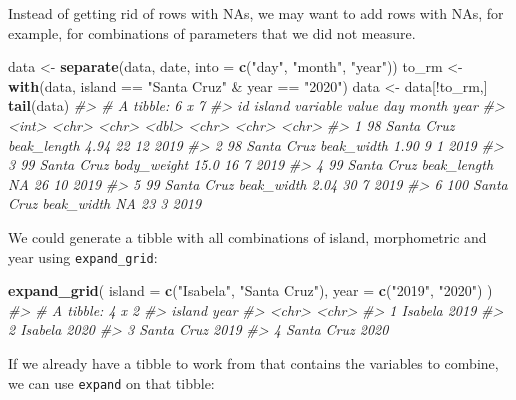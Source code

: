 \documentclass[]{book}
\newenvironment{Shaded}{}{}
\newcommand{\CommentTok}[1]{\textcolor[rgb]{0.38,0.63,0.69}{\textit{#1}}}
\newcommand{\DataTypeTok}[1]{\textcolor[rgb]{0.56,0.13,0.00}{#1}}
\newcommand{\KeywordTok}[1]{\textcolor[rgb]{0.00,0.44,0.13}{\textbf{#1}}}
\newcommand{\NormalTok}[1]{#1}
\newcommand{\OperatorTok}[1]{\textcolor[rgb]{0.40,0.40,0.40}{#1}}
\newcommand{\StringTok}[1]{\textcolor[rgb]{0.25,0.44,0.63}{#1}}
\begin{document}
Instead of getting rid of rows with NAs, we may want to add rows with NAs, for example, for combinations of parameters that we did not measure.

\begin{Shaded}
\begin{Highlighting}[]
\NormalTok{data <-}\StringTok{ }\KeywordTok{separate}\NormalTok{(data, date, }\DataTypeTok{into =} \KeywordTok{c}\NormalTok{(}\StringTok{"day"}\NormalTok{, }\StringTok{"month"}\NormalTok{, }\StringTok{"year"}\NormalTok{))}
\NormalTok{to_rm <-}\StringTok{ }\KeywordTok{with}\NormalTok{(data, island }\OperatorTok{==}\StringTok{ "Santa Cruz"} \OperatorTok{&}\StringTok{ }\NormalTok{year }\OperatorTok{==}\StringTok{ "2020"}\NormalTok{)}
\NormalTok{data <-}\StringTok{ }\NormalTok{data[}\OperatorTok{!}\NormalTok{to_rm,]}
\KeywordTok{tail}\NormalTok{(data)}
\CommentTok{#> # A tibble: 6 x 7}
\CommentTok{#>      id island     variable    value day   month year }
\CommentTok{#>   <int> <chr>      <chr>       <dbl> <chr> <chr> <chr>}
\CommentTok{#> 1    98 Santa Cruz beak_length  4.94 22    12    2019 }
\CommentTok{#> 2    98 Santa Cruz beak_width   1.90 9     1     2019 }
\CommentTok{#> 3    99 Santa Cruz body_weight 15.0  16    7     2019 }
\CommentTok{#> 4    99 Santa Cruz beak_length NA    26    10    2019 }
\CommentTok{#> 5    99 Santa Cruz beak_width   2.04 30    7     2019 }
\CommentTok{#> 6   100 Santa Cruz beak_width  NA    23    3     2019}
\end{Highlighting}
\end{Shaded}

We could generate a tibble with all combinations of island, morphometric and year using \texttt{expand\_grid}:

\begin{Shaded}
\begin{Highlighting}[]
\KeywordTok{expand_grid}\NormalTok{(}
  \DataTypeTok{island =} \KeywordTok{c}\NormalTok{(}\StringTok{"Isabela"}\NormalTok{, }\StringTok{"Santa Cruz"}\NormalTok{),}
  \DataTypeTok{year =} \KeywordTok{c}\NormalTok{(}\StringTok{"2019"}\NormalTok{, }\StringTok{"2020"}\NormalTok{)}
\NormalTok{)}
\CommentTok{#> # A tibble: 4 x 2}
\CommentTok{#>   island     year }
\CommentTok{#>   <chr>      <chr>}
\CommentTok{#> 1 Isabela    2019 }
\CommentTok{#> 2 Isabela    2020 }
\CommentTok{#> 3 Santa Cruz 2019 }
\CommentTok{#> 4 Santa Cruz 2020}
\end{Highlighting}
\end{Shaded}

If we already have a tibble to work from that contains the variables to combine, we can use \texttt{expand} on that tibble:
\end{document}
